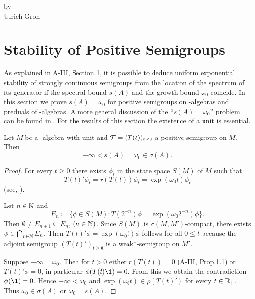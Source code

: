 \label{chap:d4}
{\Large
\vspace*{-.75cm}
by \\[.25em]
Ulrich Groh
\vspace{.75cm}
\\
}
\section{Stability of Positive Semigroups}\label{sec:d4-1}
As explained in A-III, Section 1, it is possible to deduce uniform exponential stability of strongly continuous semigroups from the location of the spectrum of its generator if the spectral bound $ s(A) $ and the growth bound $ \omega_{0} $ coincide.
In this section we prove $s(A) = \omega_{0}$ for positive semigroups on \CA-algebras and preduals of \WA-algebras.
A more general discussion of the \enquote{$s(A) = \omega_{0}$} problem can be found in \citet{greinervoigtwolff:1981}.
For the results of this section the existence of a unit is essential.
\begin{theorem}\label{thm:d4-1.1}
Let $M$ be a \CA-algebra with unit and $\mathcal{T} = (T(t))_{t \geq 0}$ a positive semigroup on $M$.
Then
\[
	-\infty < s(A) = \omega_{0} \in \sigma(A).
\]
\end{theorem}
\begin{proof}
For every  $t \geq 0 $ there exists $\phi_{t}$ in the state space $S(M)$ of $M$ such that
\[
	T(t)'\phi_{t} = r(T(t))\phi_{t} = \exp(\omega_{0} t)\phi_{t}
\]
(see, \eg \citet[2.1]{groh:1981}).

Let $n \in \mathbb{N}$ and
\[
	E_{n} \coloneqq \{\phi \in S(M) \colon T(2^{-n})\phi = \exp(\omega_{0} 2^{-n})\phi \}.
\]
Then $\emptyset \neq E_{n+1} \subseteq E_{n}$,  $(n \in \mathbb{N})$.
Since $S(M)$ is $\sigma(M,M')$-compact, there exists $\phi \in \bigcap_{n \in \mathbb{N}} E_{n}$.
Then $ T(t)'\phi = \exp(\omega_{0} t)\phi$ follows for all $ 0 \leq t $ because the adjoint semigroup $(T(t)')_{t \geq 0}$ is a weak*-semigroup on $M'$.

Suppose $-\infty = \omega_{0}$.
Then for $t > 0$ either $r(T(t)) = 0$ (A-III, Prop.1.1) or $T(t)'\phi = 0$, in particular $\phi(T(t)\1) = 0$.
From this we obtain the contradiction $\phi(\1) = 0$.
Hence $-\infty < \omega_{0}$ and $\exp(\omega_{0} t) \in \rho(T(t)')$ for every $t \in \mathbb{R}_{+}$.
Thus $\omega_{0} \in \sigma(A)$ or $\omega_{0} = s(A)$.
\end{proof}
